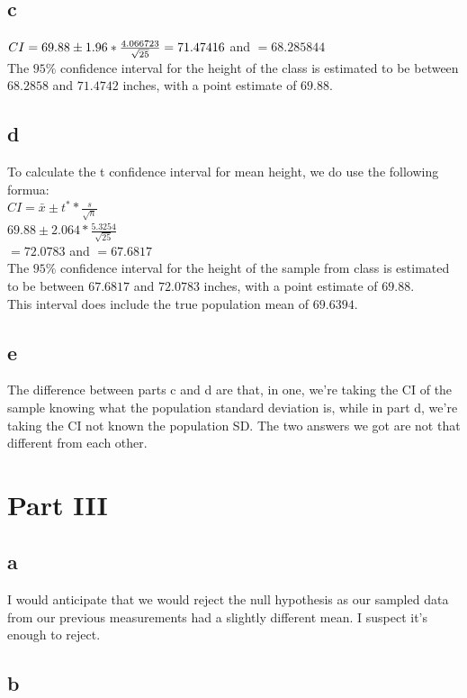 \documentclass[10pt,letterpaper]{article}
\begin{document}
\subsection*{c}
$CI=69.88 \pm 1.96*\frac{4.066723}{\sqrt{25}}\\
=71.47416$ and $=68.285844$\\
The $95\%$ confidence interval for the height of the class is estimated to be
between $68.2858$ and $71.4742$ inches, with a point estimate of $69.88$.
\subsection*{d}
To calculate the t confidence interval for mean height, we do use the following
formua:\\
$CI=\bar{x}\pm t^* * \frac{s}{\sqrt{n}}$\\
$69.88 \pm 2.064*\frac{5.3254}{\sqrt{25}}$\\
$=72.0783$ and $=67.6817$\\
The $95\%$ confidence interval for the height of the sample from class is
estimated to be between $67.6817$ and $72.0783$ inches, with a point estimate
of $69.88$.\\
This interval does include the true population mean of $69.6394$.\\

\subsection*{e}
The difference between parts c and d are that, in one, we're taking the CI of
the sample knowing what the population standard deviation is, while in part d,
we're taking the CI not known the population SD. The two answers we got are not
that different from each other.

\section*{Part III}
\subsection*{a}
I would anticipate that we would reject the null hypothesis as our sampled data
from our previous measurements had a slightly different mean. I suspect it's
enough to reject.
\subsection*{b}
\end{document}
